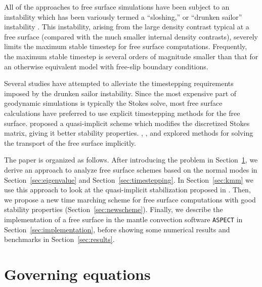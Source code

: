 \documentclass[preprint,12pt,authoryear]{elsarticle}
\begin{document}
All of the approaches to free surface simulations have been subject to an instability which has been 
variously termed a ``sloshing,'' or ``drunken sailor'' instability \citep{kaus2010stabilization, duretz2011discretization, kramer2012implicit}. 
This instability, arising from the large density contrast typical at a free surface (compared with the much smaller 
internal density contrasts), severely limits the maximum stable timestep for free surface computations.
Frequently, the maximum stable timestep is several orders of magnitude smaller than that for an otherwise 
equivalent model with free-slip boundary conditions.

Several studies have attempted to alleviate the timestepping requirements imposed by the drunken sailor 
instability. Since the most expensive part of geodynamic simulations is typically the Stokes solve,
most free surface calculations have preferred to use explicit timestepping methods for the free 
surface. \citet{kaus2010stabilization} proposed a quasi-implicit scheme which modifies the discretized 
Stokes matrix, giving it better stability properties.  \citet{popov2008slim3d}, \citet{kramer2012implicit}, and \citet{furuichi2015implicit}
explored methods for solving the transport of the free surface implicitly.

The paper is organized as follows.
After introducing the problem in Section~\ref{sec:governing},
we derive an approach to analyze 
free surface schemes based on the normal modes in Section~\ref{sec:eigenvalue}
and Section~\ref{sec:timestepping}.
In Section~\ref{sec:kmm} we use this approach to look at the
quasi-implicit stabilization proposed in \citet{kaus2010stabilization}.
Then, we propose a new time marching scheme for free surface computations with 
good stability properties (Section~\ref{sec:newscheme}).
Finally, we describe the implementation of a free surface in the mantle convection software \texttt{ASPECT} in Section~\ref{sec:implementation}, 
before showing some numerical results and benchmarks in Section~\ref{sec:results}. 


\section{Governing equations}
\label{sec:governing}
\end{document}
